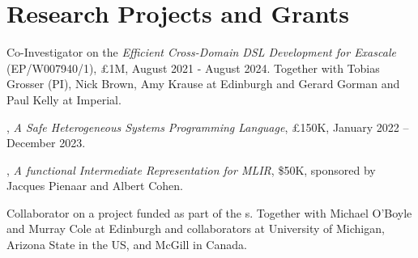 \section{Research Projects and Grants}
\begin{cvitemize}
    \item Co-Investigator on the  \emph{Efficient Cross-Domain DSL Development for Exascale} (EP/W007940/1), £1M, August 2021 - August 2024.
    Together with Tobias Grosser (PI), Nick Brown, Amy Krause at Edinburgh and Gerard Gorman and Paul Kelly at Imperial.
\end{cvitemize}
\begin{cvitemize}
    \item {}, \textit{A Safe Heterogeneous Systems Programming Language}, £150K, January 2022 -- December 2023.%
\end{cvitemize}
\begin{cvitemize}
    \item {}, \textit{A functional Intermediate Representation for MLIR}, \$50K, sponsored by Jacques Pienaar and Albert Cohen.%
\end{cvitemize}
\begin{cvitemize}
    \item Collaborator on a project funded as part of the s.
    Together with Michael O'Boyle and Murray Cole at Edinburgh and collaborators at University of Michigan, Arizona State in the US, and McGill in Canada.
\end{cvitemize}